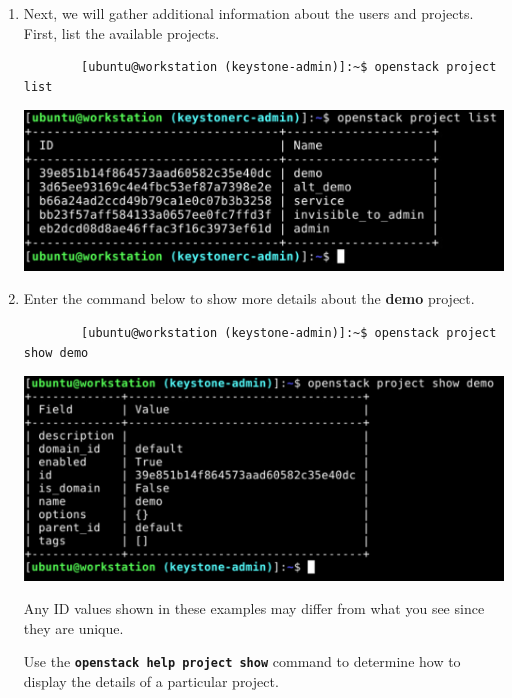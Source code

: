 \documentclass[letterpaper, 12pt]{article}
\begin{document}
\begin{enumerate}
    \item Next, we will gather additional information about the users and projects. First, list the available projects.
    \begin{lstlisting}
        [ubuntu@workstation (keystone-admin)]:~$ openstack project list
    \end{lstlisting}

    \begin{center}
        \includegraphics[width=\linewidth]{images/part2/step5.png}
    \end{center}

    \item Enter the command below to show more details about the \textbf{demo} project.
    \begin{lstlisting}
        [ubuntu@workstation (keystone-admin)]:~$ openstack project show demo
    \end{lstlisting}

    \begin{center}
        \includegraphics[width=\linewidth]{images/part2/step6.png}
    \end{center}

    \begin{notebox}
        Any ID values shown in these examples may differ from what you see since they are unique.
    \end{notebox}

    \begin{tipbox}
        Use the \textbf{\texttt{openstack help project show}} command to determine how to display the details of a
        particular project.
    \end{tipbox}


\end{enumerate}
\end{document}
